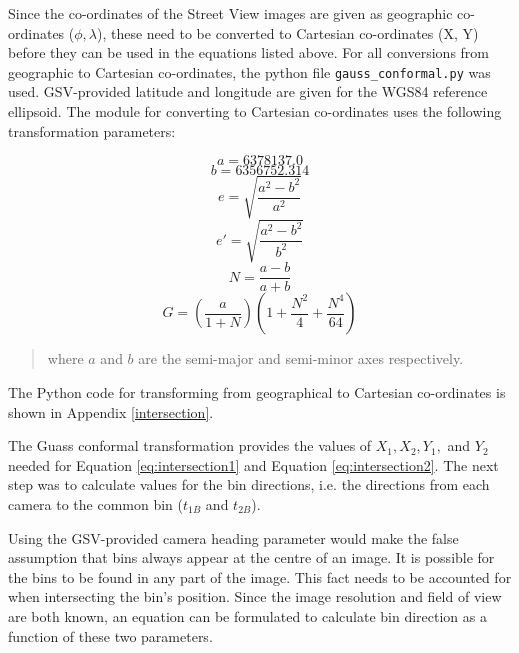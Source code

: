 Since the co-ordinates of the Street View images are given as geographic co-ordinates ($\phi, \lambda$), these need to be converted to Cartesian co-ordinates (X, Y) before they can be used in the equations listed above. For all conversions from geographic to Cartesian co-ordinates, the python file \verb|gauss_conformal.py| was used. GSV-provided latitude and longitude are given for the WGS84 reference ellipsoid. The module for converting to Cartesian co-ordinates uses the following transformation parameters:

\begin{equation}
    a = 6378137.0 \nonumber
\end{equation}
\vspace{2px}
\begin{equation}
    b = 6356752.314 \nonumber
\end{equation}
\vspace{2px}
\begin{equation}
    e = \sqrt{\dfrac{a^2 - b^2}{a^2}} \nonumber
\end{equation}
\vspace{2px}
\begin{equation}
    e' = \sqrt{\dfrac{a^2 - b^2}{b^2}} \nonumber
\end{equation}
\vspace{2px}
\begin{equation}
    N = \dfrac{a - b}{a + b} \nonumber
\end{equation}
\vspace{2px}
\begin{equation}
    G = (\dfrac{a}{1 + N})(1 + \dfrac{N^2}{4} + \dfrac{N^4}{64}) \nonumber
\end{equation}

\begin{quote}
    where $a$ and $b$ are the semi-major and semi-minor axes respectively.
\end{quote}

The Python code for transforming from geographical to Cartesian co-ordinates is shown in Appendix \ref{intersection}.

The Guass conformal transformation provides the values of $X_1,  X_2, Y_1,$ and $Y_2$ needed for Equation \ref{eq:intersection1} and Equation \ref{eq:intersection2}. The next step was to calculate values for the bin directions, i.e. the directions from each camera to the common bin ($t_{1B}$ and $t_{2B}$). 

Using the GSV-provided camera heading parameter would make the false assumption that bins always appear at the centre of an image. It is possible for the bins to be found in any part of the image. This fact needs to be accounted for when intersecting the bin's position. Since the image resolution and field of view are both known, an equation can be formulated to calculate bin direction as a function of these two parameters.


